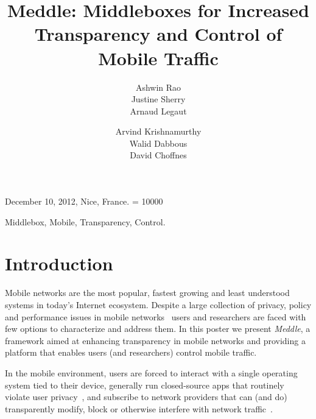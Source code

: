 \documentclass{sig-alternate}
\title{Meddle: Middleboxes for Increased Transparency and Control of
  Mobile Traffic\vspace{-0.2in}}
\author{
\alignauthor
Ashwin Rao\\
\affaddr{INRIA}
\alignauthor        
Justine Sherry\\
\affaddr{UC Berkeley}
\alignauthor
Arnaud Legaut\\
\affaddr{INRIA}
\and
\alignauthor 
Arvind Krishnamurthy\\
\affaddr{University of Washington}
\alignauthor
Walid Dabbous\\
\affaddr{INRIA}
\alignauthor
David Choffnes\\
\affaddr{University of Washington}
}
\newcommand{\meddle}{{\em Meddle}\xspace}
\begin{document}
	
 {December 10, 2012, Nice, France.}
\widowpenalty = 10000

\maketitle



\begin{keywords}
Middlebox, Mobile, Transparency, Control.
\end{keywords}

\section{Introduction}

Mobile networks are the most popular, fastest growing and least
understood systems in today's Internet ecosystem. Despite a large
collection of privacy, policy and performance issues in mobile
networks~\cite{enck:taintdroid, hornyack:appfence} users and
researchers are faced with few options to characterize and address
them. In this poster we present \meddle, a framework aimed at
enhancing transparency in mobile networks and providing a platform
that enables users (and researchers) control mobile traffic.

In the mobile environment, users are forced to interact with a single
operating system tied to their device, generally run closed-source
apps that routinely violate user privacy~\cite{hornyack:appfence}, and
subscribe to network providers that can (and do) transparently modify,
block or otherwise interfere with network
traffic~\cite{wang:middleboxes}.  
\end{document}
